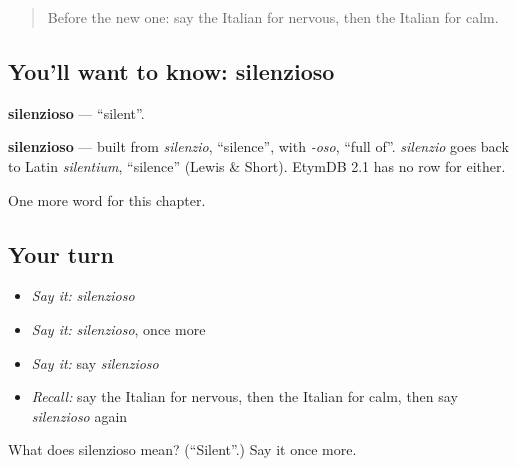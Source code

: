 \begin{quote}
Before the new one: say the Italian for nervous, then the Italian for calm.
\end{quote}

\subsection*{You'll want to know: silenzioso}
\textbf{silenzioso} — \textquotedblleft{}silent\textquotedblright{}.

\begin{cousinweb}
\textbf{silenzioso} — built from \emph{silenzio}, \textquotedblleft{}silence\textquotedblright{}, with \emph{-oso}, \textquotedblleft{}full of\textquotedblright{}. \emph{silenzio} goes back to Latin \emph{silentium}, \textquotedblleft{}silence\textquotedblright{} (Lewis \& Short). EtymDB 2.1 has no row for either.
\end{cousinweb}

\begin{grammarlens}[title={What you've built}]
One more word for this chapter.
\end{grammarlens}

\subsection*{Your turn}
\begin{itemize}
\raggedright
  \item \emph{Say it:} \emph{silenzioso}
  \item \emph{Say it:} \emph{silenzioso}, once more
  \item \emph{Say it:} say \emph{silenzioso}
  \item \emph{Recall:} say the Italian for nervous, then the Italian for calm, then say \emph{silenzioso} again
\end{itemize}

\begin{tcolorbox}[breakable,colback=teal!4,colframe=teal!35!black,title={Before you move on}]
What does silenzioso mean? (\textquotedblleft{}Silent\textquotedblright{}.) Say it once more.
\end{tcolorbox}
